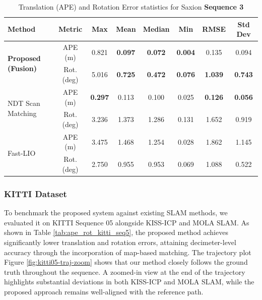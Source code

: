 \begin{table}[H]
	\centering
	\renewcommand{\arraystretch}{0.6}
	\setlength{\tabcolsep}{15pt}
	\caption{Translation (APE) and Rotation Error statistics for Saxion \textbf{Sequence 3} }
	\label{tab:ape_rot_saxion_seq3}
	
	\begin{adjustbox}{width=\textwidth}
		\begin{tabular}{@{}lccccccc@{}}
			\toprule
			\textbf{Method} & \textbf{Metric} & \textbf{Max} & \textbf{Mean} & \textbf{Median} & \textbf{Min} & \textbf{RMSE} & \textbf{Std Dev} \\
			\midrule
			
			\multirow{2}{*}{\textbf{Proposed (Fusion)}} 
			& APE (m)        & 0.821   & \textbf{0.097}   & \textbf{0.072}     & \textbf{0.004}   & 0.135   & 0.094 \\
			& Rot. (deg)     & 5.016   & \textbf{0.725}   & \textbf{0.472}     & \textbf{0.076}   & \textbf{1.039}   & \textbf{0.743} \\
			\midrule
			
			\multirow{2}{*}{NDT Scan Matching} 
			& APE (m)        & \textbf{0.297}   & 0.113   & 0.100     & 0.025    & \textbf{0.126}   & \textbf{0.056} \\
			& Rot. (deg)     & 3.236   & 1.373   & 1.286     & 0.131    & 1.652   & 0.919 \\
			\midrule
			
			\multirow{2}{*}{Fast-LIO} 
			& APE (m)        & 3.475   & 1.468   & 1.254     & 0.028    & 1.862   & 1.145 \\
			& Rot. (deg)     & 2.750   & 0.955   & 0.953     & 0.069    & 1.088   & 0.522 \\
			\bottomrule
		\end{tabular}
	\end{adjustbox}
\end{table}

\subsubsection{KITTI Dataset} 
To benchmark the proposed system against existing SLAM methods, we evaluated it on KITTI Sequence 05 alongside KISS-ICP and MOLA SLAM. As shown in Table \ref{tab:ape_rot_kitti_seq5}, the proposed method achieves significantly lower translation and rotation errors, attaining decimeter-level accuracy through the incorporation of map-based matching. The trajectory plot Figure \ref{fig:kitti05-traj-zoom} shows that our method closely follows the ground truth throughout the sequence. A zoomed-in view at the end of the trajectory highlights substantial deviations in both KISS-ICP and MOLA SLAM, while the proposed approach remains well-aligned with the reference path.

